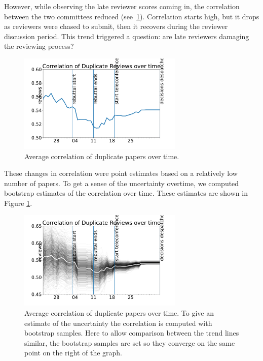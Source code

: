 However, while observing the late reviewer scores coming in, the correlation between the two committees reduced (see~\ref{correlation-duplicate-reviews}). Correlation starts high, but it drops as reviewers were chased to submit, then it recovers during the reviewer discussion period. This trend triggered a question: are late reviewers damaging the reviewing process?

\begin{figure}[htb]
\centering
\includegraphics[width=0.70\textwidth]{diagrams/neurips/correlation-duplicate-reviews.pdf}


\caption{Average correlation of duplicate papers over time.}
\label{correlation-duplicate-reviews}
\end{figure}

These changes in correlation were point estimates based on a relatively low number of papers. To get a sense of the uncertainty overtime, we computed bootstrap estimates of the correlation over time. These estimates are shown in Figure \ref{correlation-duplicate-reviews}.

\begin{figure}[htb]
\centering
\includegraphics[width=0.70\textwidth]{diagrams/neurips/correlation-duplicate-reviews-bootstrap.pdf}


\caption{Average correlation of duplicate papers over time. To give an estimate of the uncertainty the correlation is computed with bootstrap samples. Here to allow comparison between the trend lines similar, the bootstrap samples are set so they converge on the same point on the right of the graph.}
\label{correlation-duplicate-reviews-bootstrap}
\end{figure}

